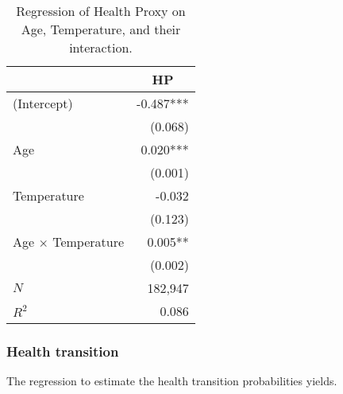 \documentclass{article}
\begin{document}
\begin{table}[H]
    \begin{center}
        \begin{tabular}{lr}
            \toprule
                                    & \multicolumn{1}{c}{HP} \\ 
            \midrule
            (Intercept)              &              -0.487*** \\ 
                                    &                (0.068) \\ 
            Age                      &               0.020*** \\ 
                                    &                (0.001) \\ 
            Temperature              &                 -0.032 \\ 
                                    &                (0.123) \\ 
            Age $\times$ Temperature &                0.005** \\ 
                                    &                (0.002) \\ 
            \midrule
            $N$                      &                182,947 \\ 
            $R^2$                    &                  0.086 \\ 
            \bottomrule
        \end{tabular}
        \caption{Regression of Health Proxy on Age, Temperature, and their interaction.}
    \end{center}
\end{table}

\subsubsection{Health transition}

The regression to estimate the health transition probabilities
yields. 
\end{document}
